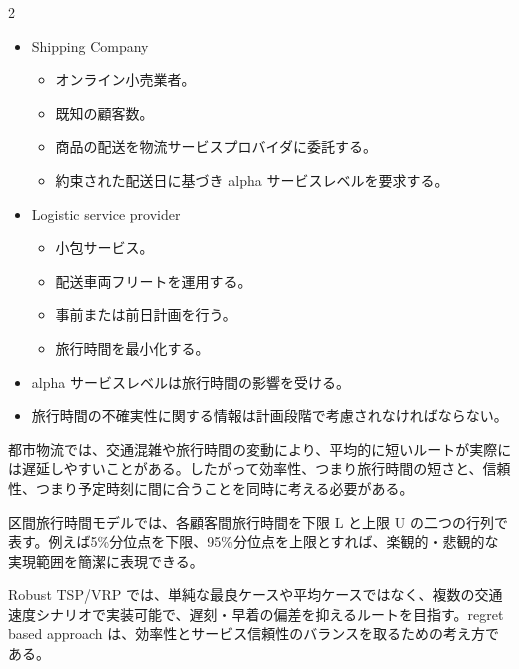 \clearpage



\vspace{1.5mm}

\begin{multicols}{2}

\footnotesize

\raggedcolumns


\begin{itemize}
\item Shipping Company
\begin{itemize}
\item オンライン小売業者。
\item 既知の顧客数。
\item 商品の配送を物流サービスプロバイダに委託する。
\item 約束された配送日に基づき alpha サービスレベルを要求する。
\end{itemize}
\item Logistic service provider
\begin{itemize}
\item 小包サービス。
\item 配送車両フリートを運用する。
\item 事前または前日計画を行う。
\item 旅行時間を最小化する。
\end{itemize}
\item alpha サービスレベルは旅行時間の影響を受ける。
\item 旅行時間の不確実性に関する情報は計画段階で考慮されなければならない。
\end{itemize}

都市物流では、交通混雑や旅行時間の変動により、平均的に短いルートが実際には遅延しやすいことがある。したがって効率性、つまり旅行時間の短さと、信頼性、つまり予定時刻に間に合うことを同時に考える必要がある。\par

区間旅行時間モデルでは、各顧客間旅行時間を下限 L と上限 U の二つの行列で表す。例えば5\%分位点を下限、95\%分位点を上限とすれば、楽観的・悲観的な実現範囲を簡潔に表現できる。\par

Robust TSP/VRP では、単純な最良ケースや平均ケースではなく、複数の交通速度シナリオで実装可能で、遅刻・早着の偏差を抑えるルートを目指す。regret based approach は、効率性とサービス信頼性のバランスを取るための考え方である。\par


\end{multicols}

